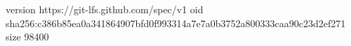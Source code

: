 version https://git-lfs.github.com/spec/v1
oid sha256:c386b85ea0a341864907bfd0f993314a7e7a0b3752a800333caa90c23d2ef271
size 98400
